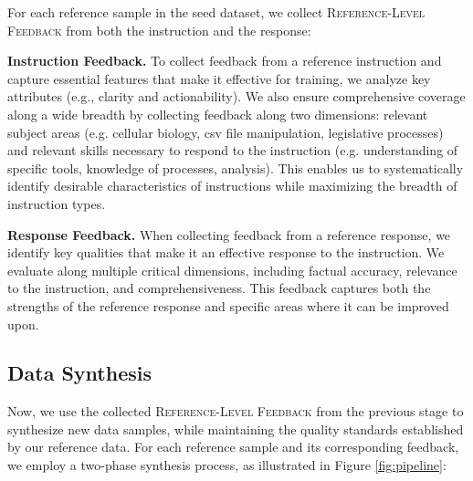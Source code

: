 For each reference sample in the seed dataset, we collect \textsc{Reference-Level Feedback} from both the instruction and the response:

\textbf{Instruction Feedback.} To collect feedback from a reference instruction and capture essential features that make it effective for training, we analyze key attributes (e.g., clarity and actionability). We also ensure comprehensive coverage along a wide breadth by collecting feedback along two dimensions: relevant subject areas (e.g. cellular biology, csv file manipulation, legislative processes) and relevant skills necessary to respond to the instruction (e.g. understanding of specific tools, knowledge of processes, analysis). This enables us to systematically identify desirable characteristics of instructions while maximizing the breadth of instruction types.

\textbf{Response Feedback.} When collecting feedback from a reference response, we identify key qualities that make it an effective response to the instruction. We evaluate along multiple critical dimensions, including factual accuracy, relevance to the instruction, and comprehensiveness. This feedback captures both the strengths of the reference response and specific areas where it can be improved upon.


\subsection{Data Synthesis}
Now, we use the collected \textsc{Reference-Level Feedback} from the previous stage to synthesize new data samples, while maintaining the quality standards established by our reference data. For each reference sample and its corresponding feedback, we employ a two-phase synthesis process, as illustrated in Figure \ref{fig:pipeline}:

